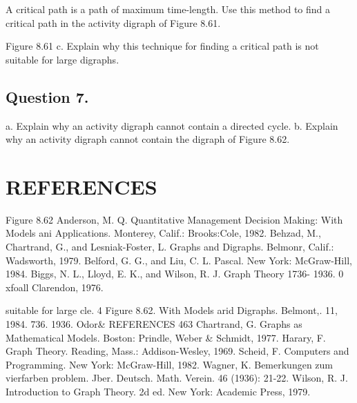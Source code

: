 \documentclass{article}
\begin{document}
A critical path is a path of maximum time-length. Use this method to find a critical path in the activity digraph of Figure 8.61. 

Figure 8.61 
c. Explain why this technique for finding a critical path is not suitable for large digraphs. 

\subsection{Question 7.} a. Explain why an activity digraph cannot contain a directed cycle. 
b. Explain why an activity digraph cannot contain the digraph of Figure 8.62. 


\section{REFERENCES} 
Figure 8.62 
Anderson, M. Q. Quantitative Management Decision Making: With Models ani Applications. Monterey, Calif.: Brooks:Cole, 1982. Behzad, M., Chartrand, G., and Lesniak-Foster, L. Graphs and Digraphs. Belmonr, Calif.: Wadsworth, 1979. Belford, G. G., and Liu, C. L. Pascal. New York: McGraw-Hill, 1984. Biggs, N. L., Lloyd, E. K., and Wilson, R. J. Graph Theory 1736- 1936. 0 xfoall Clarendon, 1976. 




suitable for large 
cle. 4 Figure 8.62. 
With Models arid Digraphs. Belmont,. 11, 1984. 736. 1936. Odor& 
REFERENCES 463 Chartrand, G. Graphs as Mathematical Models. Boston: Prindle, Weber & Schmidt, 1977. Harary, F. Graph Theory. Reading, Mass.: Addison-Wesley, 1969. Scheid, F. Computers and Programming. New York: McGraw-Hill, 1982. Wagner, K. Bemerkungen zum vierfarben problem. Jber. Deutsch. Math. Verein. 46 (1936): 21-22. Wilson, R. J. Introduction to Graph Theory. 2d ed. New York: Academic Press, 1979. 
\end{document}
